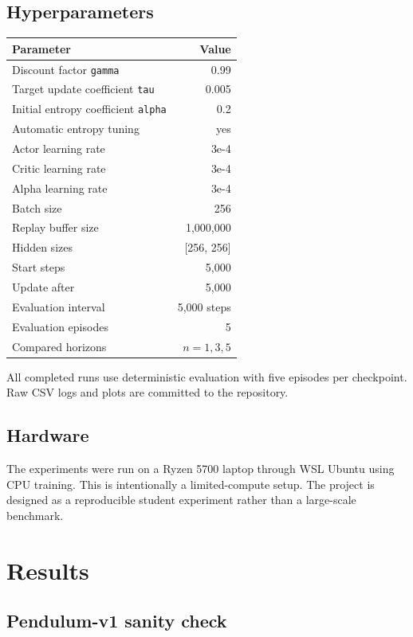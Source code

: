 \documentclass[
  american,
]{article}
\begin{document}
\subsection{Hyperparameters}\label{hyperparameters}

\begin{longtable}[]{@{}lr@{}}
\toprule\noalign{}
Parameter & Value \\
\midrule\noalign{}
\endhead
\bottomrule\noalign{}
\endlastfoot
Discount factor \texttt{gamma} & 0.99 \\
Target update coefficient \texttt{tau} & 0.005 \\
Initial entropy coefficient \texttt{alpha} & 0.2 \\
Automatic entropy tuning & yes \\
Actor learning rate & 3e-4 \\
Critic learning rate & 3e-4 \\
Alpha learning rate & 3e-4 \\
Batch size & 256 \\
Replay buffer size & 1,000,000 \\
Hidden sizes & {[}256, 256{]} \\
Start steps & 5,000 \\
Update after & 5,000 \\
Evaluation interval & 5,000 steps \\
Evaluation episodes & 5 \\
Compared horizons & \(n=1,3,5\) \\
\end{longtable}

All completed runs use deterministic evaluation with five episodes per
checkpoint. Raw CSV logs and plots are committed to the repository.

\subsection{Hardware}\label{hardware}

The experiments were run on a Ryzen 5700 laptop through WSL Ubuntu using
CPU training. This is intentionally a limited-compute setup. The project
is designed as a reproducible student experiment rather than a
large-scale benchmark.

\section{Results}\label{results}

\subsection{Pendulum-v1 sanity check}\label{pendulum-v1-sanity-check}
\end{document}
